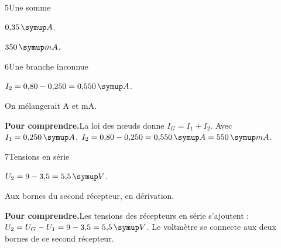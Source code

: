 \par\noindent\begin{minipage}{\linewidth}
\begin{corrige}{5}{Une somme}
\begin{questions}
\item $0{,}35\unite A$.
\item $350\unite{mA}$.
\end{questions}
\end{corrige}
\end{minipage}
\par\noindent\begin{minipage}{\linewidth}
\begin{corrige}{6}{Une branche inconnue}
\begin{questions}
\item $I_2=0{,}80-0{,}250=0{,}550\unite A$.
\item On mélangerait A et mA.
\end{questions}
\par\smallskip\noindent\textbf{Pour comprendre.}\enspace La loi des nœuds donne $I_G=I_1+I_2$. Avec $I_1=0{,}250\unite A$, $I_2=0{,}80-0{,}250=0{,}550\unite A=550\unite{mA}$.\par
{}
\end{corrige}
\end{minipage}
\par\noindent\begin{minipage}{\linewidth}
\begin{corrige}{7}{Tensions en série}
\begin{questions}
\item $U_2=9-3{,}5=5{,}5\unite V$.
\item Aux bornes du second récepteur, en dérivation.
\end{questions}
\par\smallskip\noindent\textbf{Pour comprendre.}\enspace Les tensions des récepteurs en série s’ajoutent : $U_2=U_G-U_1=9-3{,}5=5{,}5\unite V$. Le voltmètre se connecte aux deux bornes de ce second récepteur.\par
{}
\end{corrige}
\end{minipage}
